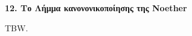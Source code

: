 \documentclass[12pt,a4paper,reqno]{amsart}
\theoremstyle{definition}
\theoremstyle{remark}
\numberwithin{theorem}{section}
\numberwithin{exercise}{section}
\numberwithin{equation}{section}
\begin{document}
\newpage
\setcounter{section}{12}
\setcounter{theorem}{0}
\setcounter{equation}{0}
\begin{center}
    \textbf{12. Το Λήμμα κανονονικοποίησης της Noether}
\end{center}

TBW.


\end{document}
